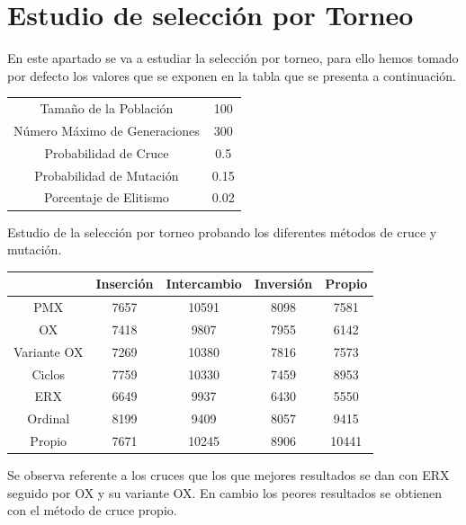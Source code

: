 \documentclass[12pt]{article}
\begin{document}
\section{Estudio de selección por Torneo}

    En este apartado se va a estudiar la selección por torneo, para ello hemos tomado por defecto los
    valores que se exponen en la tabla que se presenta a continuación.

\begin{table}[H]
\begin{center}
\begin{tabular}{|cc|} \hline
Tamaño de la Población   & 100  \\  
Número Máximo de Generaciones  &  300 \\
Probabilidad de Cruce & 0.5 \\
Probabilidad de Mutación & 0.15 \\
Porcentaje de Elitismo & 0.02 \\ \hline
\end{tabular}
\end{center}
\end{table}

Estudio de la selección por torneo probando los diferentes métodos de cruce y mutación.

\begin{table}[H]
\begin{center}
\begin{tabular}{|ccccc|} \hline
	   & Inserción & Intercambio & Inversión & Propio \\  \hline
PMX 	   &  7657 & 10591 & 8098 & 7581 \\ 
OX 	   & 7418 & 9807 & 7955 & 6142  \\ 
Variante OX & 7269 & 10380 & 7816 & 7573 \\
Ciclos 	   & 7759 & 10330 & 7459 & 8953 \\
ERX 	   & 6649 & 9937 & 6430 & 5550 \\
Ordinal    & 8199 & 9409 & 8057 & 9415 \\
Propio     & 7671 & 10245 & 8906 & 10441 \\  \hline
\end{tabular}
\end{center}
\end{table}

	Se observa referente a los cruces que los que mejores resultados se dan con ERX seguido por OX y su variante OX. En cambio los peores resultados se obtienen con el método de cruce propio.
\end{document}
